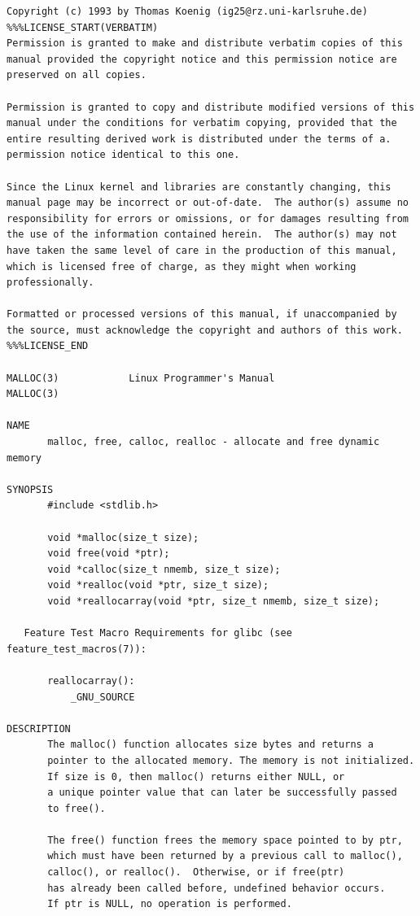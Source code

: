 {
\begin{center}
\fontsize{10pt}{10pt}\selectfont

\begin{verbatim}
Copyright (c) 1993 by Thomas Koenig (ig25@rz.uni-karlsruhe.de)
%%%LICENSE_START(VERBATIM)
Permission is granted to make and distribute verbatim copies of this
manual provided the copyright notice and this permission notice are
preserved on all copies.

Permission is granted to copy and distribute modified versions of this
manual under the conditions for verbatim copying, provided that the
entire resulting derived work is distributed under the terms of a.
permission notice identical to this one.

Since the Linux kernel and libraries are constantly changing, this
manual page may be incorrect or out-of-date.  The author(s) assume no
responsibility for errors or omissions, or for damages resulting from
the use of the information contained herein.  The author(s) may not
have taken the same level of care in the production of this manual,
which is licensed free of charge, as they might when working
professionally.

Formatted or processed versions of this manual, if unaccompanied by
the source, must acknowledge the copyright and authors of this work.
%%%LICENSE_END

MALLOC(3)            Linux Programmer's Manual                MALLOC(3) 

NAME
       malloc, free, calloc, realloc - allocate and free dynamic memory

SYNOPSIS
       #include <stdlib.h>

       void *malloc(size_t size);
       void free(void *ptr);
       void *calloc(size_t nmemb, size_t size);
       void *realloc(void *ptr, size_t size);
       void *reallocarray(void *ptr, size_t nmemb, size_t size);

   Feature Test Macro Requirements for glibc (see feature_test_macros(7)):

       reallocarray():
           _GNU_SOURCE

DESCRIPTION
       The malloc() function allocates size bytes and returns a
       pointer to the allocated memory. The memory is not initialized.
       If size is 0, then malloc() returns either NULL, or     
       a unique pointer value that can later be successfully passed
       to free().

       The free() function frees the memory space pointed to by ptr,
       which must have been returned by a previous call to malloc(),
       calloc(), or realloc().  Otherwise, or if free(ptr)     
       has already been called before, undefined behavior occurs.
       If ptr is NULL, no operation is performed.


\end{verbatim}
\end{center}}
